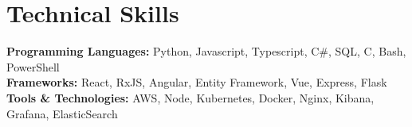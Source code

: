 \documentclass[letterpaper,10pt]{article}
\makeatletter
\newcommand{\resumeOrganizationHeading}[4]{
  \vspace{-2pt}\item
    \begin{tabular*}{0.97\textwidth}[t]{l@{\extracolsep{\fill}}r}
      \textbf{#1} & \textit{\small #2} \\
      \textit{\small#3}
    \end{tabular*}\vspace{-7pt}
}
\newcommand{\resumeSubHeadingListStart}{\begin{itemize}[leftmargin=0.15in, label={}]}
\newcommand{\resumeSubHeadingListEnd}{\end{itemize}}
\makeatother
\begin{document}



\section{Technical Skills}
  \vspace{2pt}
  \resumeSubHeadingListStart
    \small{\item{
        \textbf{Programming Languages:}{ Python, Javascript, Typescript, C\#, SQL, C, Bash, PowerShell} \\ \vspace{3pt}
        \textbf{Frameworks:}{ React, RxJS, Angular, Entity Framework, Vue, Express, Flask} \\ \vspace{3pt}
        \textbf{Tools \& Technologies:}{ AWS, Node, Kubernetes, Docker, Nginx, Kibana, Grafana, ElasticSearch} \\
    }}
  \resumeSubHeadingListEnd



    
    

\end{document}
